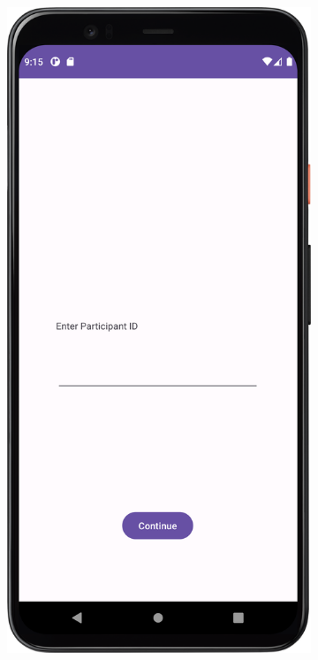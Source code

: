 \begin{figure}[htbp]
\begin{subfigure}[b]{0.3\textwidth}
        \label{subfig:chooseTestSubject2}
    \end{subfigure}
    \hfill
    \begin{subfigure}[b]{0.3\textwidth}
        \centering
        \includegraphics[width=\textwidth]{content/06_demonstration_of_the_artifact/Screenshot_ParticipantSelectionScreen.png}

\end{subfigure}
\end{figure}
